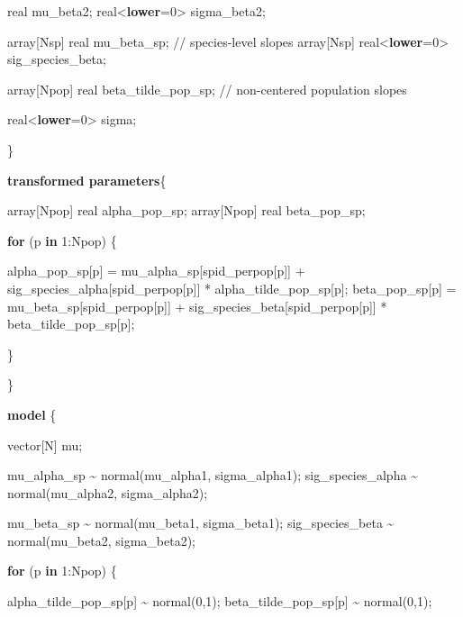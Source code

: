 \documentclass[
  letterpaper,
  DIV=11,
  numbers=noendperiod]{scrartcl}
\newenvironment{Shaded}{\begin{snugshade}}{\end{snugshade}}
\newcommand{\CommentTok}[1]{\textcolor[rgb]{0.37,0.37,0.37}{#1}}
\newcommand{\ControlFlowTok}[1]{\textcolor[rgb]{0.00,0.23,0.31}{\textbf{#1}}}
\newcommand{\DataTypeTok}[1]{\textcolor[rgb]{0.68,0.00,0.00}{#1}}
\newcommand{\DecValTok}[1]{\textcolor[rgb]{0.68,0.00,0.00}{#1}}
\newcommand{\KeywordTok}[1]{\textcolor[rgb]{0.00,0.23,0.31}{\textbf{#1}}}
\newcommand{\NormalTok}[1]{\textcolor[rgb]{0.00,0.23,0.31}{#1}}
\begin{document}
\begin{Shaded}
\begin{Highlighting}[]
  \DataTypeTok{real}\NormalTok{ mu\_beta2;}
  \DataTypeTok{real}\NormalTok{\textless{}}\KeywordTok{lower}\NormalTok{=}\DecValTok{0}\NormalTok{\textgreater{} sigma\_beta2;}
  
  \DataTypeTok{array}\NormalTok{[Nsp] }\DataTypeTok{real}\NormalTok{ mu\_beta\_sp; }\CommentTok{// species{-}level slopes}
  \DataTypeTok{array}\NormalTok{[Nsp] }\DataTypeTok{real}\NormalTok{\textless{}}\KeywordTok{lower}\NormalTok{=}\DecValTok{0}\NormalTok{\textgreater{} sig\_species\_beta;}
  
  \DataTypeTok{array}\NormalTok{[Npop] }\DataTypeTok{real}\NormalTok{ beta\_tilde\_pop\_sp; }\CommentTok{// non{-}centered population slopes}
  
  \DataTypeTok{real}\NormalTok{\textless{}}\KeywordTok{lower}\NormalTok{=}\DecValTok{0}\NormalTok{\textgreater{} sigma;}
   
\NormalTok{\}}

\KeywordTok{transformed parameters}\NormalTok{\{}
  
  \DataTypeTok{array}\NormalTok{[Npop] }\DataTypeTok{real}\NormalTok{ alpha\_pop\_sp;}
  \DataTypeTok{array}\NormalTok{[Npop] }\DataTypeTok{real}\NormalTok{ beta\_pop\_sp;}
  
  \ControlFlowTok{for}\NormalTok{ (p }\ControlFlowTok{in} \DecValTok{1}\NormalTok{:Npop) \{}
    
\NormalTok{      alpha\_pop\_sp[p] = mu\_alpha\_sp[spid\_perpop[p]] }
\NormalTok{      + sig\_species\_alpha[spid\_perpop[p]] *  alpha\_tilde\_pop\_sp[p];}
\NormalTok{      beta\_pop\_sp[p] = mu\_beta\_sp[spid\_perpop[p]] }
\NormalTok{      + sig\_species\_beta[spid\_perpop[p]] *  beta\_tilde\_pop\_sp[p];}

\NormalTok{  \}}
  
\NormalTok{\}}

\KeywordTok{model}\NormalTok{ \{}
  
  \DataTypeTok{vector}\NormalTok{[N] mu;}
  
\NormalTok{  mu\_alpha\_sp \textasciitilde{} normal(mu\_alpha1, sigma\_alpha1);}
\NormalTok{  sig\_species\_alpha \textasciitilde{} normal(mu\_alpha2, sigma\_alpha2);}
  
\NormalTok{  mu\_beta\_sp \textasciitilde{} normal(mu\_beta1, sigma\_beta1);}
\NormalTok{  sig\_species\_beta \textasciitilde{} normal(mu\_beta2, sigma\_beta2);}
  
  \ControlFlowTok{for}\NormalTok{ (p }\ControlFlowTok{in} \DecValTok{1}\NormalTok{:Npop) \{}
    
\NormalTok{    alpha\_tilde\_pop\_sp[p] \textasciitilde{} normal(}\DecValTok{0}\NormalTok{,}\DecValTok{1}\NormalTok{);}
\NormalTok{    beta\_tilde\_pop\_sp[p] \textasciitilde{} normal(}\DecValTok{0}\NormalTok{,}\DecValTok{1}\NormalTok{);}
    

\end{Highlighting}
\end{Shaded}
\end{document}
